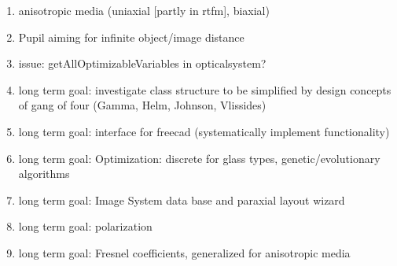 \documentclass[12pt,a4paper,twoside,openright,BCOR10mm,headsepline,titlepage,abstracton,chapterprefix,final]{scrreprt}
\begin{document}
\begin{enumerate}
 \item anisotropic media (uniaxial [partly in rtfm], biaxial)
 \item Pupil aiming for infinite object/image distance
 \item issue: getAllOptimizableVariables in opticalsystem?
 \item long term goal: investigate class structure to be simplified by design concepts of gang of four (Gamma, Helm, Johnson, Vlissides)
 \item long term goal: interface for freecad (systematically implement functionality)
 \item long term goal: Optimization: discrete for glass types, genetic/evolutionary algorithms
 \item long term goal: Image System data base and paraxial layout wizard
 \item long term goal: polarization
 \item long term goal: Fresnel coefficients, generalized for anisotropic media
\end{enumerate}
\end{document}
